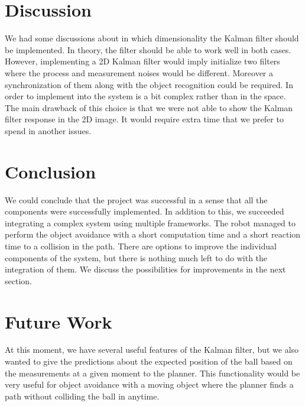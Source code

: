 \newpage
\section{Discussion}
\label{sec:dis}
We had some discussions about in which dimensionality the Kalman filter should be implemented. In theory, the filter should be able to work well in both cases. However, implementing a 2D Kalman filter would imply initialize two filters where the process and measurement noises would be different. Moreover a synchronization of them along with the object recognition could be required. In order to implement into the system is a bit complex rather than in the space. The main drawback of this choice is that we were not able to show the Kalman filter response in the 2D image. It would require extra time that we prefer to spend in another issues.



\section{Conclusion}
\label{sec:con}
We could conclude that the project was successful in a sense that all the components were successfully implemented. In addition to this, we succeeded integrating a complex system using multiple frameworks. The robot managed to perform the object avoidance with a short computation time and a short reaction time to a collision in the path. There are options to improve the individual components of the system, but there is nothing much left to do with the integration of them. We discuss the possibilities for improvements in the next section.


\section{Future Work}
At this moment, we have several useful features of the Kalman filter, but we also wanted to give the predictions about the expected position of the ball based on the measurements at a given moment to the planner. This functionality would be very useful for object avoidance with a moving object where the planner finds a path without colliding the ball in anytime. 

